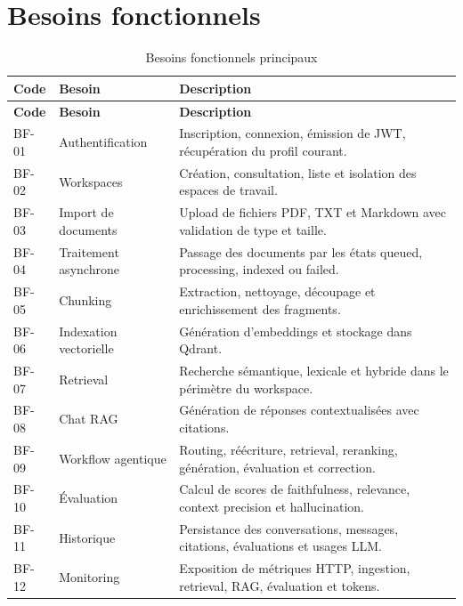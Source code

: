 \documentclass[12pt,a4paper,oneside]{report}
\begin{document}
\section{Besoins fonctionnels}
\begin{longtable}{L{2.2cm}L{4.3cm}Y}
  \caption{Besoins fonctionnels principaux}\\
  \toprule
  \textbf{Code} & \textbf{Besoin} & \textbf{Description} \\
  \midrule
  \endfirsthead
  \toprule
  \textbf{Code} & \textbf{Besoin} & \textbf{Description} \\
  \midrule
  \endhead
  BF-01 & Authentification & Inscription, connexion, émission de JWT, récupération du profil courant. \\
  BF-02 & Workspaces & Création, consultation, liste et isolation des espaces de travail. \\
  BF-03 & Import de documents & Upload de fichiers PDF, TXT et Markdown avec validation de type et taille. \\
  BF-04 & Traitement asynchrone & Passage des documents par les états queued, processing, indexed ou failed. \\
  BF-05 & Chunking & Extraction, nettoyage, découpage et enrichissement des fragments. \\
  BF-06 & Indexation vectorielle & Génération d'embeddings et stockage dans Qdrant. \\
  BF-07 & Retrieval & Recherche sémantique, lexicale et hybride dans le périmètre du workspace. \\
  BF-08 & Chat RAG & Génération de réponses contextualisées avec citations. \\
  BF-09 & Workflow agentique & Routing, réécriture, retrieval, reranking, génération, évaluation et correction. \\
  BF-10 & Évaluation & Calcul de scores de faithfulness, relevance, context precision et hallucination. \\
  BF-11 & Historique & Persistance des conversations, messages, citations, évaluations et usages LLM. \\
  BF-12 & Monitoring & Exposition de métriques HTTP, ingestion, retrieval, RAG, évaluation et tokens. \\
  \bottomrule
\end{longtable}
\end{document}
